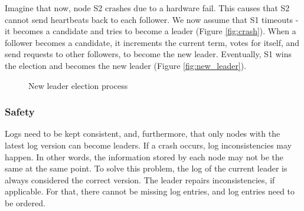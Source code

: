 \documentclass[12pt,a4paper]{article}
\begin{document}
Imagine that now, node S2 crashes due to a hardware fail. This causes that S2 cannot send heartbeats back to each follower. We now assume that S1 timeouts - it becomes a candidate and tries to become a leader (Figure \ref{fig:crash}). When a follower becomes a candidate, it increments the current term, votes for itself, and send requests to other followers, to become the new leader. Eventually, S1 wins the election and becomes the new leader (Figure \ref{fig:new_leader}).

\begin{figure}[h!]
    \centering
    \qquad
    \caption{New leader election process}%
    \label{fig:leader_election}%
\end{figure}


\subsubsection{Safety}
Logs need to be kept consistent, and, furthermore, that only nodes with the latest log version can become leaders. 
If a crash occurs, log inconsistencies may happen. In other words, the information stored by each node may not be the same at the same point. To solve this problem, the log of the current leader is always considered the correct version. The leader repairs inconsistencies, if applicable. For that, there cannot be missing log entries, and log entries need to be ordered.
\end{document}
